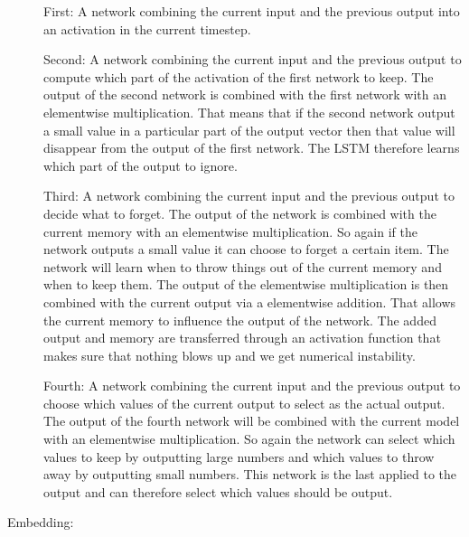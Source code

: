 \begin{description}
        First: A network combining the current input and the previous output into
        an activation in the current timestep.

        Second: A network combining the current input and the previous output to
        compute which part of the activation of the first network to keep. The
        output of the second network is combined with the first network with an
        elementwise multiplication. That means that if the second network output
        a small value in a particular part of the output vector then that value
        will disappear from the output of the first network. The \gls{LSTM}
        therefore learns which part of the output to ignore.

        Third: A network combining the current input and the previous output
        to decide what to forget. The output of the network is combined with
        the current memory with an elementwise multiplication. So again if the
        network outputs a small value it can choose to forget a certain item.
        The network will learn when to throw things out of the current memory
        and when to keep them. The output of the elementwise multiplication is
        then combined with the current output via a elementwise addition. That
        allows the current memory to influence the output of the network. The
        added output and memory are transferred through an activation function
        that makes sure that nothing blows up and we get numerical instability.

        Fourth: A network combining the current input and the previous output
        to choose which values of the current output to select as the actual
        output. The output of the fourth network will be combined with the
        current model with an elementwise multiplication. So again the network
        can select which values to keep by outputting large numbers and which
        values to throw away by outputting small numbers. This network is the
        last applied to the output and can therefore select which values should
        be output.


    \item[Embedding:]


\end{description}
